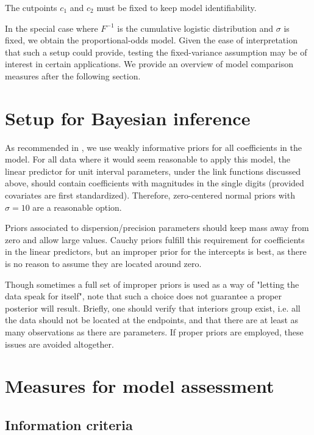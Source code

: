 The cutpoints $c_1$ and $c_2$ must be fixed to keep model identifiability.

In the special case where $F^{-1}$ is the cumulative logistic distribution and $\sigma$ is fixed, we obtain the proportional-odds model. Given the ease of interpretation that such a setup could provide, testing the fixed-variance assumption may be of interest in certain applications. We provide an overview of model comparison measures after the following section.

\section{Setup for Bayesian inference}

As recommended in \cite{Gelman2013}, we use weakly informative priors for all coefficients in the model. For all data where it would seem reasonable to apply this model, the linear predictor for unit interval parameters, under the link functions discussed above, should contain coefficients with magnitudes in the single digits (provided covariates are first standardized). Therefore, zero-centered normal priors with $\sigma=10$ are a reasonable option.

Priors associated to dispersion/precision parameters should keep mass away from zero and allow large values. Cauchy priors fulfill this requirement for coefficients in the linear predictors, but an improper prior for the intercepts is best, as there is no reason to assume they are located around zero.

Though sometimes a full set of improper priors is used as a way of "letting the data speak for itself",  note that such a choice does not guarantee a proper posterior will result. \cite{Tak2015} Briefly, one should verify that interiors group exist, i.e. all the data should not be located at the endpoints, and that there are at least as many observations as there are parameters. If proper priors are employed, these issues are avoided altogether.

\section{Measures for model assessment}
\label{sec:modcomp}

\subsection{Information criteria}

